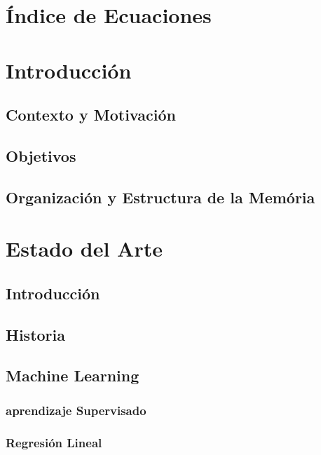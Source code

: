 \documentclass[a4paper,12pt]{article}
\begin{document}
\newpage

\section*{Índice de Ecuaciones}

\section{Introducción}

\subsection{Contexto y Motivación}

\subsection{Objetivos}

\subsection{Organización y Estructura de la Memória}

\section{Estado del Arte}

\subsection{Introducción}

\subsection{Historia}

\subsection{Machine Learning}

\subsubsection{aprendizaje Supervisado}

\subsubsection{Regresión Lineal}
\end{document}
